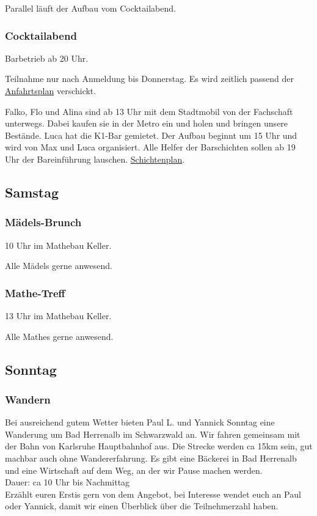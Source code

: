 \documentclass[10pt,ngerman]{scrartcl}
\begin{document}
\begin{multicols}{2}
Parallel läuft der Aufbau vom Cocktailabend.

\subsubsection{Cocktailabend}

Barbetrieb ab 20 Uhr.

Teilnahme nur nach Anmeldung bis Donnerstag.
Es wird zeitlich passend der \href{https://discord.com/channels/739522765677133894/963505261388107846/1030438323086438440}{Anfahrtsplan} verschickt.

Falko, Flo und Alina sind ab 13 Uhr mit dem Stadtmobil von der Fachschaft unterwegs.
Dabei kaufen sie in der Metro ein und holen und bringen unsere Bestände.
Luca hat die K1-Bar gemietet.
Der Aufbau beginnt um 15 Uhr und wird von Max und Luca organisiert.
Alle Helfer der Barschichten sollen ab 19 Uhr der Bareinführung lauschen.
\href{https://docs.google.com/spreadsheets/d/17ycbRMmSfck2oAsiZ9djPUULAgf4-vCJ6Q4EXgZmB0g/edit?usp=sharing}{Schichtenplan}.



\subsection{Samstag}

\subsubsection{Mädels-Brunch}

10 Uhr im Mathebau Keller.

Alle Mädels gerne anwesend.

\subsubsection{Mathe-Treff}

13 Uhr im Mathebau Keller.

Alle Mathes gerne anwesend.

\subsection{Sonntag}

\subsubsection{Wandern}

Bei ausreichend gutem Wetter bieten Paul L. und Yannick Sonntag eine Wanderung um Bad Herrenalb im Schwarzwald an.
Wir fahren gemeinsam mit der Bahn von Karlsruhe Hauptbahnhof aus.
Die Strecke werden ca 15km sein, gut machbar auch ohne Wandererfahrung.
Es gibt eine Bäckerei in Bad Herrenalb und eine Wirtschaft auf dem Weg, an der wir Pause machen werden. \\
Dauer: ca 10 Uhr bis Nachmittag \\
Erzählt euren Erstis gern von dem Angebot, bei Interesse wendet euch an Paul oder Yannick, damit wir einen Überblick über die Teilnehmerzahl haben.

\end{multicols}
\label{LastPage}
\end{document}

